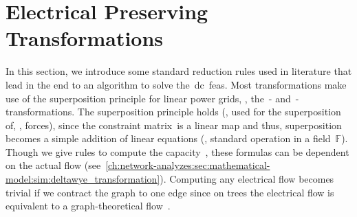 \section{Electrical Preserving Transformations}
\label{ch:network-analyzes:sec:reduction-transformation-rules}
%
In this section, we introduce some standard reduction rules used in literature
that lead in the end to an algorithm to solve the~\gls{dc}~\gls{feas}. Most
transformations make use of the superposition principle for linear power grids,
\eg, the~\deltawye- and~\wyedelta-transformations. The superposition principle
holds (\ie, used for the superposition of, \eg, forces), since the constraint
matrix~\constraintmatrix is a linear map and thus, superposition becomes a
simple addition of linear equations (\ie, standard operation in a
field~$\mathbb{F}$). Though we give rules to compute the
capacity~, these formulas can be dependent on the actual
flow
(see~\cref{ch:network-analyzes:sec:mathematical-model:sim:deltawye_transformation}).
Computing any electrical flow becomes trivial if we contract the graph to one
edge since on trees the electrical flow is equivalent to a graph-theoretical
flow~\parencite{Lei15b}\parencite[p.9; Lemma~4]{Leh15a}.

